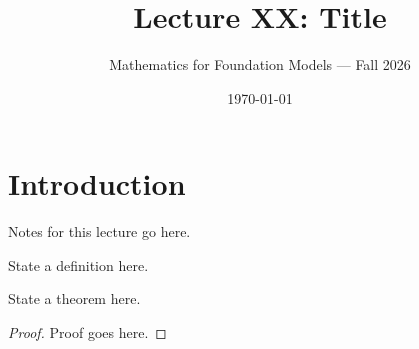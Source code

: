 \documentclass[11pt]{article}
\title{Lecture XX: Title}
\author{Mathematics for Foundation Models --- Fall 2026}
\date{\today}
\begin{document}
\maketitle

\section{Introduction}

Notes for this lecture go here.

\begin{definition}
  State a definition here.
\end{definition}

\begin{theorem}
  State a theorem here.
\end{theorem}
\begin{proof}
  Proof goes here.
\end{proof}
\end{document}
